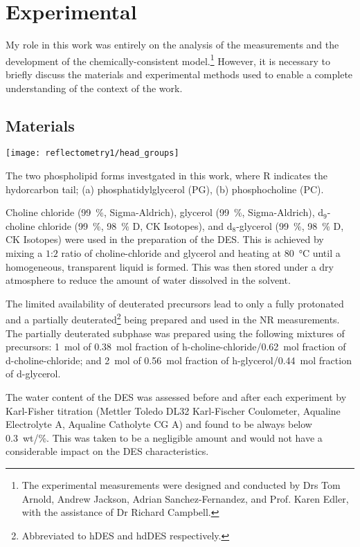 \section{Experimental}
My role in this work was entirely on the analysis of the measurements and the development of the chemically-consistent model.\footnote{The experimental measurements were designed and conducted by Drs Tom Arnold, Andrew Jackson, Adrian Sanchez-Fernandez, and Prof. Karen Edler, with the assistance of Dr Richard Campbell.}
However, it is necessary to briefly discuss the materials and experimental methods used to enable a complete understanding of the context of the work.

\subsection{Materials}
%
\begin{marginfigure}
    \centering
    \texttt{[image: reflectometry1/head\_groups]}
    \caption{The two phospholipid forms investgated in this work, where R indicates the hydorcarbon tail; (a) phosphatidylglycerol (PG), (b) phosphocholine (PC).}
    \label{fig:heads}
\end{marginfigure}
%
Choline chloride (\SI{99}{\percent}, Sigma-Aldrich), glycerol (\SI{99}{\percent}, Sigma-Aldrich), d$_{9}$-choline chloride (\SI{99}{\percent}, \SI{98}{\percent} D, CK Isotopes), and d$_{8}$-glycerol (\SI{99}{\percent}, \SI{98}{\percent} D, CK Isotopes) were used in the preparation of the DES.
This is achieved by mixing a $1$:$2$ ratio of choline-chloride and glycerol and heating at \SI{80}{\celsius} until a homogeneous, transparent liquid is formed.
This was then stored under a dry atmosphere to reduce the amount of water dissolved in the solvent.

The limited availability of deuterated precursors lead to only a fully protonated and a partially deuterated\footnote{Abbreviated to hDES and hdDES respectively.} being prepared and used in the NR measurements.
The partially deuterated subphase was prepared using the following mixtures of precursors: \SI{1}{\mole} of \SI{0.38}{\mole} fraction of h-choline-chloride/\SI{0.62}{\mole} fraction of d-choline-chloride; and \SI{2}{\mole} of \SI{0.56}{\mole} fraction of h-glycerol/\SI{0.44}{\mole} fraction of d-glycerol.

The water content of the DES was assessed before and after each experiment by Karl-Fisher titration (Mettler Toledo DL32 Karl-Fischer Coulometer, Aqualine Electrolyte A, Aqualine Catholyte CG A) and found to be always below \SI{0.3}{wt/\percent}.
This was taken to be a negligible amount and would not have a considerable impact on the DES characteristics.


